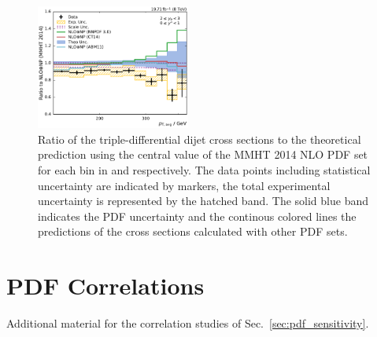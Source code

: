 \begin{figure}[htbp]
    \includegraphics[width=0.45\textwidth]{figures/measurement/ratio_to_MMHT2014+np_totcomp_yb2ys0.pdf}
    \caption[Ratio of the cross section to MMHT2014 NLO]{
    Ratio of the triple-differential dijet cross sections to the theoretical
    prediction using the central value of the MMHT 2014 NLO PDF set for each bin in \ystar
    and \yboost respectively. The data points including statistical uncertainty are
    indicated by markers, the total experimental uncertainty is represented by the
    hatched band. The solid blue band indicates the PDF uncertainty and the
    continous colored lines the predictions of the cross sections calculated with
    other PDF sets.}
    \label{fig:ratio_mmht_nlo}
\end{figure}


\section{PDF Correlations}

Additional material for the correlation studies of
Sec.~\ref{sec:pdf_sensitivity}.

